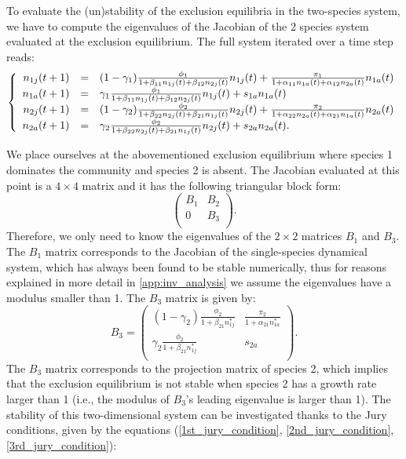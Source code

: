 \documentclass{article}
\begin{document}
To evaluate the (un)stability of the exclusion equilibria in the two-species system, we have to compute the eigenvalues of the Jacobian of the 2 species system evaluated at the exclusion equilibrium. The full system iterated over a time step reads:
\begin{equation}
    \left\{
\begin{array}{r c l}
n_{1j}(t+1) &=& (1-\gamma_1)\frac{\phi_1}{1+\beta_{11}n_{1j}(t)+\beta_{12}n_{2j}(t)}n_{1j}(t) + \frac{\pi_1}{1+\alpha_{11}n_{1a}(t)+\alpha_{12}n_{2a}(t)}n_{1a}(t)\\
n_{1a}(t+1) &=& \gamma_1 \frac{\phi_1}{1+\beta_{11}n_{1j}(t)+\beta_{12}n_{2j}(t)}n_{1j}(t) + s_{1a}n_{1a}(t)\\
n_{2j}(t+1) &=& (1-\gamma_2)\frac{\phi_2}{1+\beta_{22}n_{2j}(t)+\beta_{21}n_{1j}(t)}n_{2j}(t) + \frac{\pi_2}{1+\alpha_{22}n_{2a}(t)+\alpha_{21}n_{1a}(t)}n_{2a}(t)\\
n_{2a}(t+1) &=& \gamma_2 \frac{\phi_2}{1+\beta_{22}n_{2j}(t)+\beta_{21}n_{1j}(t)}n_{2j}(t) + s_{2a}n_{2a}(t).
\end{array}
\right.
\end{equation}

We place ourselves at the abovementioned exclusion equilibrium where species 1 dominates the community and species 2 is absent. The Jacobian evaluated at this point is a $4 \times 4$ matrix and it has the following triangular block form:
\begin{equation}
    \begin{pmatrix}
    B_1 & B_2 \\
    0 & B_3 \\
    \end{pmatrix}.
\end{equation}
Therefore, we only need to know the eigenvalues of the $2 \times 2$ matrices $B_1$ and $B_3$. 
The $B_1$ matrix corresponds to the Jacobian of the single-species dynamical system, which has always been found to be stable numerically, thus for reasons explained in more detail in \ref{app:inv_analysis} we assume the eigenvalues have a modulus smaller than 1.
The $B_3$ matrix is given by:
\begin{equation}
    B_3 =
    \begin{pmatrix}
    (1-\gamma_2)\frac{\phi_2}{1+\beta_{21}n_{1j}^*} & \frac{\pi_2}{1+\alpha_{21}n_{1a}^*} \\
    \gamma_2\frac{\phi_2}{1+\beta_{21}n_{1j}^*} & s_{2a} \\
    \end{pmatrix}.
\end{equation}
The $B_3$ matrix corresponds to the projection matrix of species 2, which implies that the exclusion equilibrium is not stable when species 2 has a growth rate larger than 1 (i.e., the modulus of $B_3$'s leading eigenvalue is larger than 1). The stability of this two-dimensional system can be investigated thanks to the Jury conditions, given by the equations (\ref{1st_jury_condition}, \ref{2nd_jury_condition}, \ref{3rd_jury_condition}):
\end{document}
